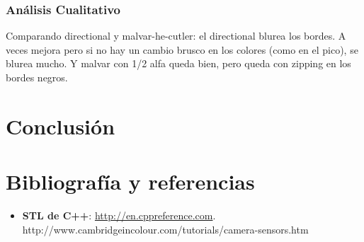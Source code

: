 \subsubsection{Análisis Cualitativo}

Comparando directional y malvar-he-cutler: el directional blurea los bordes. A veces mejora pero si no hay un cambio brusco en los colores (como en el pico), se blurea mucho. Y malvar con 1/2 alfa queda bien, pero queda con zipping en los bordes negros.


\section{Conclusión}


\section{Bibliografía y referencias} %

\begin{itemize}
	\item \textbf{STL de C++}: \url{http://en.cppreference.com}.
http://www.cambridgeincolour.com/tutorials/camera-sensors.htm
\end{itemize}



